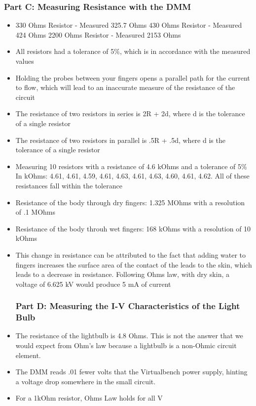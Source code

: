 \documentclass[10pt]{article}
\begin{document}
	\subsubsection{Part C: Measuring Resistance with the DMM}
	\begin{itemize}
	\item 330 Ohms Resistor - Measured 325.7 Ohms
 430 Ohms Resistor - Measured 424 Ohms
 2200 Ohms Resistor - Measured 2153 Ohms
	\item All resistors had a tolerance of 5\%, which is in accordance with the measured values
	\item Holding the probes between your fingers opens a parallel path for the current to flow, which will lead to an inaccurate measure of the resistance of the circuit  
	\item The resistance of two resistors in series is 2R + 2d, where d is the tolerance of a single resistor
	\item The resistance of two resistors in parallel is .5R + .5d, where d is the tolerance of a single resistor
	\item Measuring 10 resistors with a resistance of 4.6 kOhms and a tolerance of 5\%
In kOhms: 4.61, 4.61, 4.59, 4.61, 4.63, 4.61, 4.63, 4.60, 4.61, 4.62. All of these resistances fall within the tolerance
	\item Resistance of the body through dry fingers: 1.325 MOhms with a resolution of .1 MOhms
	\item Resistance of the body throuh wet fingers: 168 kOhms with a resolution of 10 kOhms
	\item This change in resistance can be attributed to the fact that adding water to fingers increases the surface area of the contact of the leads to the skin, which leads to a decrease in resistance. Following Ohms law, with dry skin, a voltage of 6.625 kV would produce 5 mA of current
	\subsubsection{Part D: Measuring the I-V Characteristics of the Light Bulb}
	\item The resistance of the lightbulb is 4.8 Ohms. This is not the answer that we would expect from Ohm's law because a lightbulb is a non-Ohmic circuit element.
	\item The DMM reads .01 fewer volts that the Virtualbench power supply, hinting a voltage drop somewhere in the small circuit.
	\item For a  1kOhm resistor, Ohms Law holds for all V
	\end{itemize}
\end{document}

